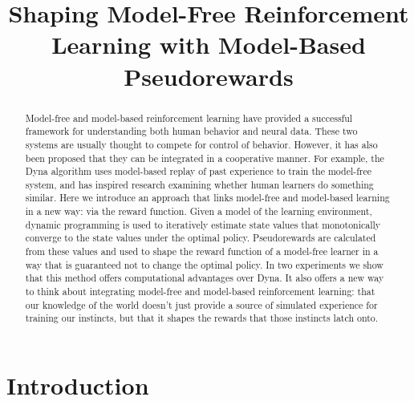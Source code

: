 \documentclass[letterpaper]{article}
\begin{document}
%

\title{Shaping Model-Free Reinforcement Learning with Model-Based Pseudorewards}
\date{}
\maketitle
\begin{abstract}
Model-free and model-based reinforcement learning have provided a successful framework for understanding both human behavior and neural data. These two systems are usually thought to compete for control of behavior. However, it has also been proposed that they can be integrated in a cooperative manner. For example, the Dyna algorithm uses model-based replay of past experience to train the model-free system, and has inspired research examining whether human learners do something similar. Here we introduce an approach that links model-free and model-based learning in a new way: via the reward function. Given a model of the learning environment, dynamic programming is used to iteratively estimate state values that monotonically converge to the state values under the optimal policy. Pseudorewards are calculated from these values and used to shape the reward function of a model-free learner in a way that is guaranteed not to change the optimal policy. In two experiments we show that this method offers computational advantages over Dyna. It also offers a new way to think about integrating model-free and model-based reinforcement learning: that our knowledge of the world doesn't just provide a source of simulated experience for training our instincts, but that it shapes the rewards that those instincts latch onto.
\end{abstract}

\section{Introduction}
\end{document}
